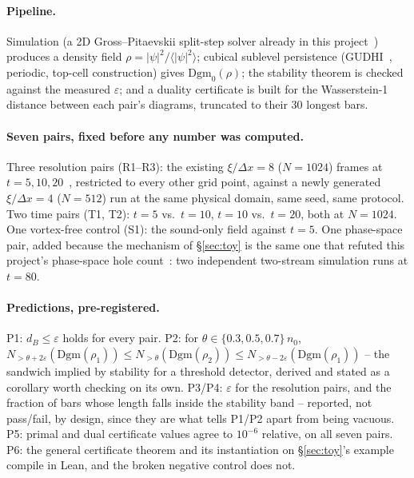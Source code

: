 \documentclass[11pt,a4paper]{article}
\newcommand{\dB}{d_{B}}
\begin{document}
\paragraph{Pipeline.} Simulation (a 2D Gross--Pitaevskii split-step solver already in this
project~\cite{Callens2026TDA}) produces a density field $\rho=|\psi|^2/\langle|\psi|^2\rangle$; cubical
sublevel persistence (GUDHI~\cite{GUDHI}, periodic, top-cell construction) gives $\mathrm{Dgm}_0(\rho)$;
the stability theorem is checked against the measured $\varepsilon$; and a duality certificate is built
for the Wasserstein-1 distance between each pair's diagrams, truncated to their $30$ longest bars.

\paragraph{Seven pairs, fixed before any number was computed.} Three resolution pairs (R1--R3): the
existing $\xi/\Delta x=8$ ($N=1024$) frames at $t=5,10,20$~\cite{Callens2026TDA}, restricted to every
other grid point, against a newly generated $\xi/\Delta x=4$ ($N=512$) run at the same physical domain,
same seed, same protocol. Two time pairs (T1, T2): $t=5$ vs.\ $t=10$, $t=10$ vs.\ $t=20$, both at
$N=1024$. One vortex-free control (S1): the sound-only field against $t=5$. One phase-space pair, added
because the mechanism of \S\ref{sec:toy} is the same one that refuted this project's phase-space hole
count~\cite{Callens2026TDA}: two independent two-stream simulation runs at $t=80$.

\paragraph{Predictions, pre-registered.} P1: $\dB\le\varepsilon$ holds for every pair. P2: for
$\theta\in\{0.3,0.5,0.7\}\,n_0$, $N_{>\theta+2\varepsilon}(\mathrm{Dgm}(\rho_1))\le
N_{>\theta}(\mathrm{Dgm}(\rho_2))\le N_{>\theta-2\varepsilon}(\mathrm{Dgm}(\rho_1))$ -- the sandwich
implied by stability for a threshold detector, derived and stated as a corollary worth checking on its
own. P3/P4: $\varepsilon$ for the resolution pairs, and the fraction of bars whose length falls inside
the stability band -- reported, not pass/fail, by design, since they are what tells P1/P2 apart from
being vacuous. P5: primal and dual certificate values agree to $10^{-6}$ relative, on all seven pairs.
P6: the general certificate theorem and its instantiation on \S\ref{sec:toy}'s example compile in Lean,
and the broken negative control does not.
\end{document}
